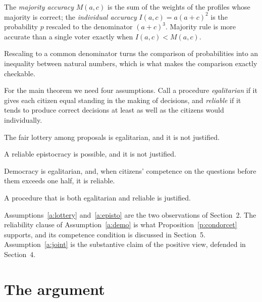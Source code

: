 \documentclass{situationist-preprint}
\begin{document}
\begin{definition}\label{d:accuracy}
The \emph{majority accuracy} $M(a,c)$ is the sum of the weights of the profiles whose majority is correct; the \emph{individual accuracy} $I(a,c) = a(a+c)^2$ is the probability $p$ rescaled to the denominator $(a+c)^3$. Majority rule is more accurate than a single voter exactly when $I(a,c) < M(a,c)$.
\end{definition}

Rescaling to a common denominator turns the comparison of probabilities into an inequality between natural numbers, which is what makes the comparison exactly checkable.

For the main theorem we need four assumptions. Call a procedure \emph{egalitarian} if it gives each citizen equal standing in the making of decisions, and \emph{reliable} if it tends to produce correct decisions at least as well as the citizens would individually.

\begin{assumption}[Lottery]\label{a:lottery}
The fair lottery among proposals is egalitarian, and it is not justified.
\end{assumption}

\begin{assumption}[Epistocracy]\label{a:episto}
A reliable epistocracy is possible, and it is not justified.
\end{assumption}

\begin{assumption}[Democracy]\label{a:demo}
Democracy is egalitarian, and, when citizens' competence on the questions before them exceeds one half, it is reliable.
\end{assumption}

\begin{assumption}\label{a:joint}
A procedure that is both egalitarian and reliable is justified.
\end{assumption}

Assumptions~\ref{a:lottery} and~\ref{a:episto} are the two observations of Section~2. The reliability clause of Assumption~\ref{a:demo} is what Proposition~\ref{p:condorcet} supports, and its competence condition is discussed in Section~5. Assumption~\ref{a:joint} is the substantive claim of the positive view, defended in Section~4.

\section{The argument}
\end{document}
